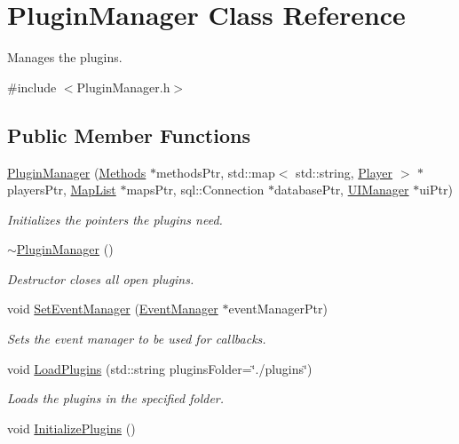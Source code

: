 \hypertarget{classPluginManager}{\section{Plugin\-Manager Class Reference}
\label{classPluginManager}
}


Manages the plugins.  




{\ttfamily \#include $<$Plugin\-Manager.\-h$>$}

\subsection*{Public Member Functions}
\begin{DoxyCompactItemize}
\item 
\hyperlink{classPluginManager_acd184211e8aafdce8207f28baef2757d}{Plugin\-Manager} (\hyperlink{classMethods}{Methods} $\ast$methods\-Ptr, std\-::map$<$ std\-::string, \hyperlink{structPlayer}{Player} $>$ $\ast$players\-Ptr, \hyperlink{classMapList}{Map\-List} $\ast$maps\-Ptr, sql\-::\-Connection $\ast$database\-Ptr, \hyperlink{classUIManager}{U\-I\-Manager} $\ast$ui\-Ptr)
\begin{DoxyCompactList}\small\item\em Initializes the pointers the plugins need. \end{DoxyCompactList}\item 
\hypertarget{classPluginManager_ab657302ef5af357907ae11ad817f5dfc}{\hyperlink{classPluginManager_ab657302ef5af357907ae11ad817f5dfc}{$\sim$\-Plugin\-Manager} ()}\label{classPluginManager_ab657302ef5af357907ae11ad817f5dfc}

\begin{DoxyCompactList}\small\item\em Destructor closes all open plugins. \end{DoxyCompactList}\item 
void \hyperlink{classPluginManager_a7ed7485291babeed3109a1a364b6d308}{Set\-Event\-Manager} (\hyperlink{classEventManager}{Event\-Manager} $\ast$event\-Manager\-Ptr)
\begin{DoxyCompactList}\small\item\em Sets the event manager to be used for callbacks. \end{DoxyCompactList}\item 
void \hyperlink{classPluginManager_a0ff203ba125f85688fa752bf789418f0}{Load\-Plugins} (std\-::string plugins\-Folder=\char`\"{}./plugins\char`\"{})
\begin{DoxyCompactList}\small\item\em Loads the plugins in the specified folder. \end{DoxyCompactList}\item 
\hypertarget{classPluginManager_aba7e19d75b25ca1a91b92d95b173240f}{void \hyperlink{classPluginManager_aba7e19d75b25ca1a91b92d95b173240f}{Initialize\-Plugins} ()}\label{classPluginManager_aba7e19d75b25ca1a91b92d95b173240f}


\end{DoxyCompactItemize}

